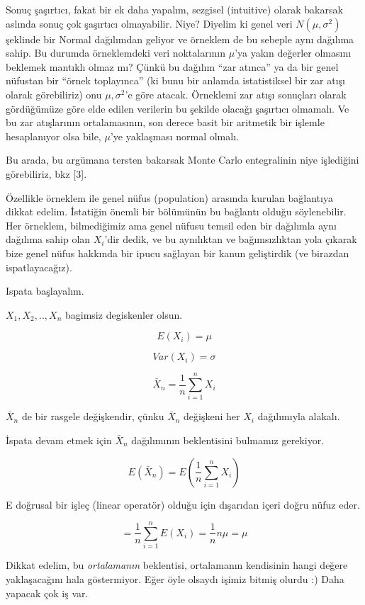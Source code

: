 \documentclass[12pt,fleqn]{article}\usepackage{../../common}
\begin{document}
Sonuç şaşırtıcı, fakat bir ek daha yapalım, sezgisel (intuitive) olarak
bakarsak aslında sonuç çok şaşırtıcı olmayabilir. Niye? Diyelim ki genel
veri $N(\mu,\sigma^2)$ şeklinde bir Normal dağılımdan geliyor ve örneklem
de bu sebeple aynı dağılıma sahip. Bu durumda örneklemdeki veri
noktalarının $\mu$'ya yakın değerler olmasını beklemek mantıklı olmaz mı?
Çünkü bu dağılım ``zar atınca'' ya da bir genel nüfustan bir ``örnek
toplayınca'' (ki bunu bir anlamda istatistiksel bir zar atışı olarak
görebiliriz) onu $\mu,\sigma^2$'e göre atacak. Örneklemi zar atışı
sonuçları olarak gördüğümüze göre elde edilen verilerin bu şekilde olacağı
şaşırtıcı olmamalı. Ve bu zar atışlarının ortalamasının, son derece basit
bir aritmetik bir işlemle hesaplanıyor olsa bile, $\mu$'ye yaklaşması
normal olmalı.

Bu arada, bu argümana tersten bakarsak Monte Carlo entegralinin niye
işlediğini görebiliriz, bkz [3].

Özellikle örneklem ile genel nüfus (population) arasında kurulan bağlantıya
dikkat edelim. İstatiğin önemli bir bölümünün bu bağlantı olduğu
söylenebilir. Her örneklem, bilmediğimiz ama genel nüfusu temsil eden bir
dağılımla aynı dağılıma sahip olan $X_i$'dir dedik, ve bu aynılıktan ve
bağımsızlıktan yola çıkarak bize genel nüfus hakkında bir ipucu sağlayan
bir kanun geliştirdik (ve birazdan ispatlayacağız).

Ispata başlayalım.

$X_1,X_2,..,X_n$ bagimsiz degiskenler olsun. 

$$ E(X_i) = \mu $$

$$ Var(X_i) = \sigma $$

$$ \bar{X}_n = \frac{1}{n} \sum_{i=1}^n X_i  $$

$\bar{X}_n$ de bir rasgele değişkendir, çünku $\bar{X}_n$ değişkeni her
$X_i$ dağılımıyla alakalı.

İspata devam etmek için $\bar{X}_n$ dağılımının beklentisini bulmamız gerekiyor. 

$$ E(\bar{X}_n) = E(\frac{1}{n} \sum_{i=1}^n X_i)  $$

E doğrusal bir işleç (linear operatör) olduğu için dışarıdan içeri doğru
nüfuz eder. 

$$ = \frac{1}{n} \sum_{i=1}^n E(X_i) = \frac{1}{n}n\mu = \mu $$

Dikkat edelim, bu {\em ortalamanın} beklentisi, ortalamanın kendisinin
hangi değere yaklaşacağını hala göstermiyor. Eğer öyle olsaydı işimiz
bitmiş olurdu :) Daha yapacak çok iş var.
\end{document}
